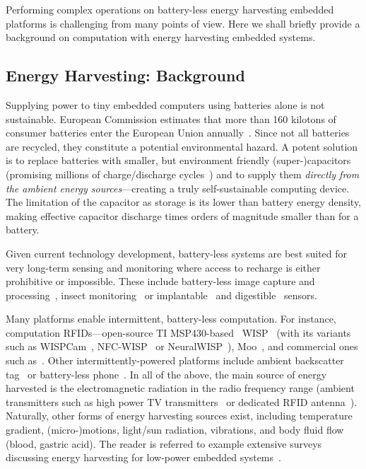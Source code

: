 Performing complex operations on battery-less energy harvesting embedded platforms is challenging from many points of view. Here we shall briefly provide a background on computation with energy harvesting embedded systems. 

\subsection{Energy Harvesting: Background}
\label{sec:background_harvesting}

Supplying power to tiny embedded computers using batteries alone is not sustainable. European Commission estimates that more than 160 kilotons of consumer batteries enter the European Union annually~\cite{eu_batteries_2016}. Since not all batteries are recycled, they constitute a potential environmental hazard. A potent solution is to replace batteries with smaller, but environment friendly {(super-)capacitors} (promising millions of charge/discharge cycles~\cite[Sec. I]{ongaro_pwre_2012}) and to supply them {\em directly from the ambient energy sources}---creating a truly self-sustainable computing device. The limitation of the capacitor as storage is its lower than battery energy density, making effective capacitor discharge times orders of magnitude smaller than for a battery.

Given current technology development, battery-less systems are best suited for very long-term sensing and monitoring where access to recharge is either prohibitive or impossible. These include battery-less image capture and processing~\cite{naderiparizi_rfid_2015}, insect monitoring~\cite{thomas_jbcs_2012} or implantable~\cite{rodriguez_tbcs_2015}  and digestible~\cite{nadeau_naturebio_2017} sensors.

Many platforms enable intermittent, battery-less computation. For instance, computation RFIDs---open-source TI MSP430-based~\cite{wolverine} WISP~\cite{wisp5} (with its variants such as WISPCam~\cite{naderiparizi_rfid_2015}, NFC-WISP~\cite{zhao_rfid_2015} or NeuralWISP~\cite{holleman_biocas_2008}), Moo~\cite{moo}, and commercial ones such as~\cite{medusa_farsens_2017}. Other intermittently-powered platforms include ambient backscatter tag~\cite{liu_sigcomm_2013,parks_sigcomm_2014} or battery-less phone~\cite{talla_imwut_2017}. In all of the above, the main source of energy harvested is the electromagnetic radiation in the radio frequency range (ambient transmitters such as high power TV transmitters~\cite{liu_sigcomm_2013} or dedicated RFID antenna~\cite{wisp5,moo,talla_imwut_2017,medusa_farsens_2017,holleman_biocas_2008,naderiparizi_rfid_2015}). Naturally, other forms of energy harvesting sources exist, including temperature gradient, (micro-)motions, light/sun radiation, vibrations, and body fluid flow (blood, gastric acid). The reader is referred to example extensive surveys discussing energy harvesting for low-power embedded systems~\cite{paradiso_pvc_2005,soyata_csm_2016,prasad_comst_2014,ku_cst_2016}.

